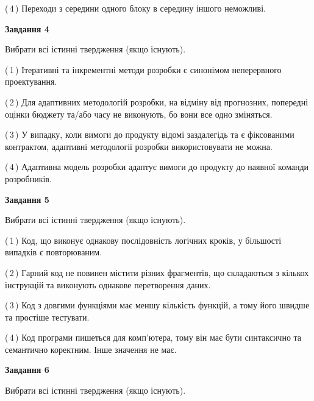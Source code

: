\documentclass[10pt, ukrainian]{article}
\begin{document}
{\begin {large}
(\,4\,) Переходи з середини одного блоку в середину іншого неможливі. %


{\begin {center}\textbf{Завдання 4}\end {center}}\par
Вибрати всі істинні твердження (якщо існують).\par
\vspace{2mm}



(\,1\,) Ітеративні та інкрементні методи розробки є синонімом неперервного проектування. %



(\,2\,) Для адаптивних методологій розробки, на відміну від прогнозних, попередні оцінки бюджету та/або часу не виконують, бо вони все одно зміняться. %



(\,3\,) У випадку, коли вимоги до продукту відомі заздалегідь та є фіксованими контрактом, адаптивні методології розробки використовувати не можна. %



(\,4\,) Адаптивна модель розробки адаптує вимоги до продукту до наявної команди розробників. %


{\begin {center}\textbf{Завдання 5}\end {center}}\par
Вибрати всі істинні твердження (якщо існують).\par
\vspace{2mm}



(\,1\,) Код, що виконує однакову послідовність логічних кроків, у більшості випадків є повторюваним.%



(\,2\,) Гарний код не повинен містити різних фрагментів, що складаються з кількох інструкцій та виконують однакове перетворення даних. %



(\,3\,) Код з довгими функціями має меншу кількість функцій, а тому його швидше та простіше тестувати. %



(\,4\,) Код програми пишеться для комп'ютера, тому він має бути синтаксично та семантично коректним. Інше значення не має. %

\newpage

{\begin {center}\textbf{Завдання 6}\end {center}}\par
Вибрати всі істинні твердження (якщо існують).\par
\vspace{2mm}




\end{large}}
\end{document}
